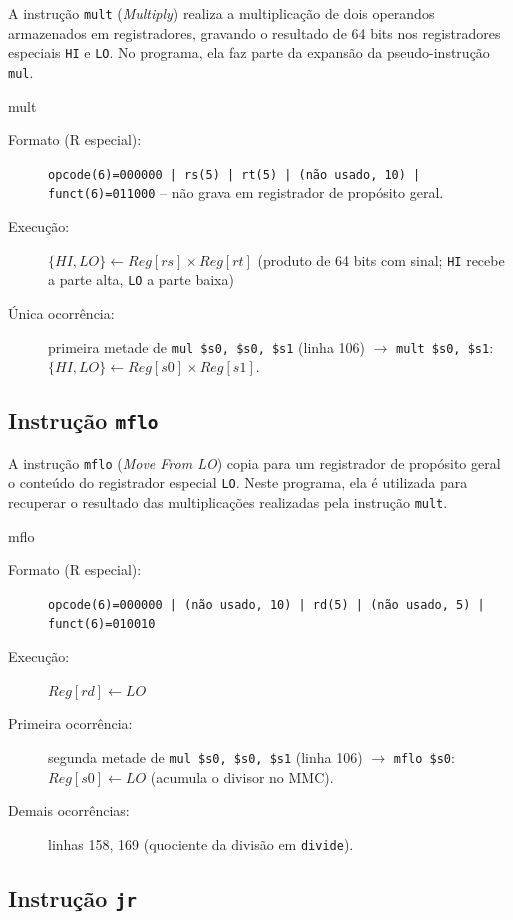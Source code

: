 A instrução \texttt{mult} (\textit{Multiply}) realiza a multiplicação de dois
operandos armazenados em registradores, gravando o resultado de 64 bits nos
registradores especiais \texttt{HI} e \texttt{LO}. No programa, ela faz parte
da expansão da pseudo-instrução \texttt{mul}.

\begin{instrucao}{mult}
\begin{description}
\item[Formato (R especial):]
\texttt{opcode(6)=000000 | rs(5) | rt(5) | (não usado, 10) | funct(6)=011000}
-- não grava em registrador de propósito geral.
\item[Execução:] $\{HI, LO\} \leftarrow Reg[rs] \times Reg[rt]$
(produto de 64 bits com sinal; \texttt{HI} recebe a parte alta,
\texttt{LO} a parte baixa)
\item[Única ocorrência:] primeira metade de
\texttt{mul \$s0, \$s0, \$s1} (linha 106) $\rightarrow$
\texttt{mult \$s0, \$s1}:
$\{HI, LO\} \leftarrow Reg[s0] \times Reg[s1]$.
\end{description}
\end{instrucao}

\subsection{Instrução \texttt{mflo}}

A instrução \texttt{mflo} (\textit{Move From LO}) copia para um registrador de
propósito geral o conteúdo do registrador especial \texttt{LO}. Neste
programa, ela é utilizada para recuperar o resultado das multiplicações
realizadas pela instrução \texttt{mult}.

\begin{instrucao}{mflo}
\begin{description}
\item[Formato (R especial):]
\texttt{opcode(6)=000000 | (não usado, 10) | rd(5) | (não usado, 5) |
funct(6)=010010}
\item[Execução:] $Reg[rd] \leftarrow LO$
\item[Primeira ocorrência:] segunda metade de
\texttt{mul \$s0, \$s0, \$s1} (linha 106) $\rightarrow$
\texttt{mflo \$s0}:
$Reg[s0] \leftarrow LO$
(acumula o divisor no MMC).
\item[Demais ocorrências:] linhas 158, 169
(quociente da divisão em \texttt{divide}).
\end{description}
\end{instrucao}

\subsection{Instrução \texttt{jr}}

